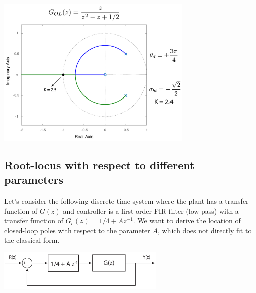 \documentclass[twoside]{article}
\begin{document}
\begin{center}
\begin{minipage}[h]{\linewidth}
    \begin{center}
      \includegraphics[width=0.7\textwidth]{E5}
    \end{center}
\end{minipage}
    \end{center}

\newpage

\subsection{Root-locus with respect to different parameters}

Let's consider the following discrete-time system where the plant has a 
transfer function of $G(z)$ and controller is a first-order FIR filter
(low-pass) with a transfer function of  $G_c(z) = 1/4 + A z^{-1}$.
We want to derive the location of closed-loop poles with respect to 
the parameter $A$, which does not directly fit to the classical form. 

\begin{center}
\begin{minipage}[h]{\linewidth}
    \begin{center}
      \includegraphics[width=0.6\textwidth]{distdiff}
    \end{center}
\end{minipage}
\end{center}
\end{document}
